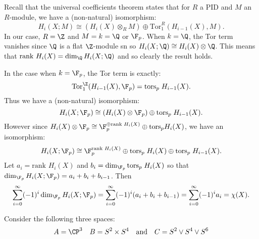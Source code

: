 \documentclass[11pt,letterpaper]{article}
\providecommand{\Tor}{\text{Tor}}
\begin{document}
\begin{solution}
    \quad Recall that the universal coefficients theorem states that for $R$ a PID and $M$ an $R$-module, we have a (non-natural) isomorphism:
    \[
        H_i(X; M) \cong \left(H_i(X)\otimes_R M\right)\oplus \Tor^R_1(H_{i-1}(X), M)
    .\]  
    In our case, $R=\Z$ and $M=k=\Q$ or $\F_p$. When $k=\Q$, the Tor term vanishes since $\Q$ is a flat $\Z$-module sn so $H_i(X; \Q) \cong H_i(X)\otimes \Q$. This means that $\text{rank }H_i(X) = \dim_\Q H_i(X; \Q)$ and so clearly the result holds.
    
    \quad In the case when $k=\F_p$, the Tor term is exactly:
    \[
        \Tor^\Z_1 (H_{i-1}(X), \F_p) = \text{tors}_p\; H_{i-1}(X).
    \]   
    Thus we have a (non-natural) isomorphism:
    \[
        H_i(X; \F_p) \cong (H_i(X)\otimes \F_p) \oplus \text{tors}_p\; H_{i-1}(X)
    .\] 
    However since $H_i(X)\otimes \F_p \cong \F_p^{\oplus \text{rank }H_i(X)}\oplus \text{tors}_p H_i(X)$, we have an isomorphism:
    \[
        H_i(X; \F_p) \cong \F_p^{\text{rank }H_i(X)}\oplus \text{tors}_p\; H_i(X) \oplus \text{tors}_p\; H_{i-1}(X)
    .\]   
    Let $a_i = \text{rank } H_i(X)$ and $b_i = \dim_{\F_p} \text{tors}_p\; H_i(X)$ so that $\dim_{\F_p} H_i(X; \F_p) = a_i + b_i + b_{i-1}$. Then
    \[
        \sum^\infty_{i=0}(-1)^i \dim_{\F_p} H_i(X; \F_p) = \sum^\infty_{i = 0}(-1)^i (a_i + b_i + b_{i-1}) = \sum_{i=0}^\infty (-1)^i a_i = \chi(X)
    .\]  
\end{solution}

\begin{problem}
    Consider the following three spaces:
    \[
        A = \CP^3 \quad B = S^2\times S^4\quad \text{and}\quad C = S^2\vee S^4\vee S^6
    \] 
\end{problem}
\end{document}
